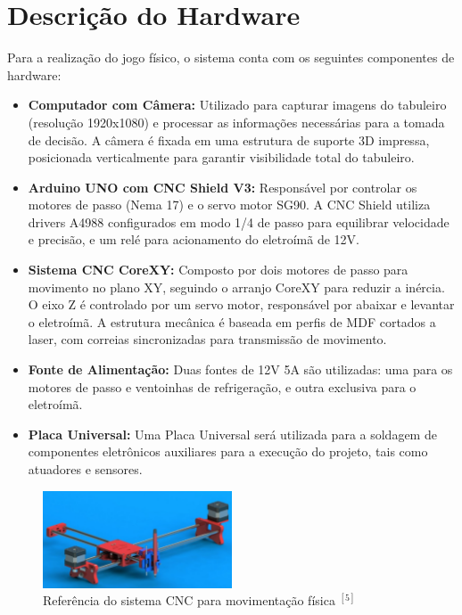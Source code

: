 \documentclass[a4paper,12pt]{article}
\begin{document}
\section{Descrição do Hardware}  
Para a realização do jogo físico, o sistema conta com os seguintes componentes de hardware:  
\begin{itemize}  
    \item \textbf{Computador com Câmera:} Utilizado para capturar imagens do tabuleiro (resolução 1920x1080) e processar as informações necessárias para a tomada de decisão. A câmera é fixada em uma estrutura de suporte 3D impressa, posicionada verticalmente para garantir visibilidade total do tabuleiro.  
    \item \textbf{Arduino UNO com CNC Shield V3:} Responsável por controlar os motores de passo (Nema 17) e o servo motor SG90. A CNC Shield utiliza drivers A4988 configurados em modo 1/4 de passo para equilibrar velocidade e precisão, e um relé para acionamento do eletroímã de 12V.  
    \item \textbf{Sistema CNC CoreXY:} Composto por dois motores de passo para movimento no plano XY, seguindo o arranjo CoreXY para reduzir a inércia. O eixo Z é controlado por um servo motor, responsável por abaixar e levantar o eletroímã. A estrutura mecânica é baseada em perfis de MDF cortados a laser, com correias sincronizadas para transmissão de movimento.  
    \item \textbf{Fonte de Alimentação:} Duas fontes de 12V 5A são utilizadas: uma para os motores de passo e ventoinhas de refrigeração, e outra exclusiva para o eletroímã.  
	\item \textbf{Placa Universal:} Uma Placa Universal será utilizada para a soldagem de componentes eletrônicos auxiliares para a execução do projeto, tais como atuadores e sensores.
\end{itemize}  

\begin{figure}[H]  
    \centering  
    \includegraphics[width=0.5\textwidth]{images/drawingbot.png}   
    \caption{Referência do sistema CNC para movimentação física $^{[5]}$}  
    \label{fig:modelo_cnc}  
\end{figure}  
\end{document}
